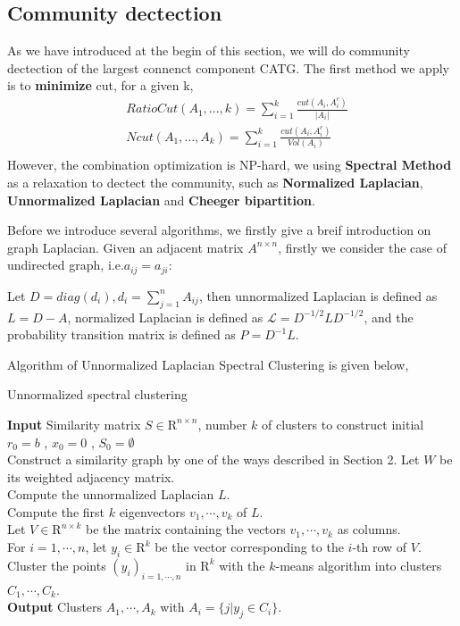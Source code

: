 \documentclass{article}
\numberwithin{equation}{section}
\begin{document}
\subsection{Community dectection}
As we have introduced at the begin of this section, we will do community dectection of the largest connenct component CATG. The first method we apply is to \textbf{minimize} cut, for a given k,
\begin{equation}
\begin{aligned}
& RatioCut(A_1,...,k) = \sum_{i=1}^k \frac{cut(A_i,A_i^c)}{|A_i|}\\
& Ncut(A_1,...,A_k) = \sum_{i=1}^k \frac{cut(A_i,A_i^c)}{Vol(A_i)}\\
\end{aligned}
\end{equation}
However, the combination optimization is NP-hard, we using \textbf{Spectral Method} as a relaxation to dectect the community, such as \textbf{Normalized Laplacian}, \textbf{Unnormalized Laplacian} and \textbf{Cheeger bipartition}.

Before we introduce several algorithms, we firstly give a breif introduction on graph Laplacian. Given an adjacent matrix $A^{n\times n}$, firstly we consider the case of undirected graph, i.e.$a_{ij} = a_{ji}$:

Let $D = diag(d_i), d_i = \sum_{j=1}^n A_{ij}$, then unnormalized Laplacian is defined as $L = D - A$, normalized Laplacian is defined as $\mathcal{L} = D^{-1/2}LD^{-1/2}$, and the probability transition matrix is defined as $P = D^{-1}L$.

Algorithm of Unnormalized Laplacian Spectral Clustering is given below,

\begin{algorithm2e}[H]\caption{Unnormalized spectral clustering}
	\textbf{Input} Similarity matrix $S\in \textrm{R}^{n\times n}$, number $k$ of clusters to construct
	initial $r_0 = b$ , $x_0=0$ , $S_0=\emptyset$\\
	 Construct
	 a similarity graph by one of the ways described in Section 2. Let $W$ be its weighted adjacency matrix.\\
	Compute the unnormalized Laplacian $L$.\\
	Compute the first $k$ eigenvectors $v_1 ,\cdots,v_k$ of $L$.\\
	Let $V \in \textrm{R}^{n\times k}$ be the matrix containing the vectors $v_1 ,\cdots,v_k$ as columns. \\
	For $i = 1,\cdots,n$, let $y_i\in \textrm{R}^k$ be the vector corresponding to the $i$-th row of $V$.\\
    Cluster the points $(y_i)_{i=1,\cdots,n}$ in $\textrm{R}^{k}$ with the $k$-means algorithm into clusters $C_1 ,\cdots,C_k$.\\
	\textbf{Output} Clusters $A_1 ,\cdots,A_k$ with $A_i = \{j| y_j \in C_i \}$.
\end{algorithm2e}
\end{document}
